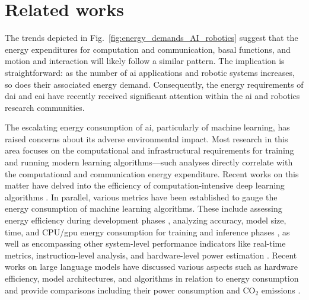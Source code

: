 \documentclass[12pt]{article}
\begin{document}
\section*{Related works}
The trends depicted in Fig.~\ref{fig:energy_demands_AI_robotics} suggest that the energy expenditures for computation and communication, basal functions, and motion and interaction will likely follow a similar pattern. The implication is straightforward: as the number of \acl{ai} applications and robotic systems increases, so does their associated energy demand. Consequently, the energy requirements of \acl{dai} and \acl{eai} have recently received significant attention within the \acl{ai} and robotics research communities.

The escalating energy consumption of \acl{ai}, particularly of machine learning, has raised concerns about its adverse environmental impact. Most research in this area focuses on the computational and infrastructural requirements for training and running modern learning algorithms---such analyses directly correlate with the computational and communication energy expenditure. Recent works on this matter have delved into the efficiency of computation-intensive deep learning algorithms \cite{Schwartz2019GreenAI,Vinuesa2020roleartificialintelligence,Strubell2019EnergyPolicyConsiderations,Luccioni2023EstimatingCarbonFootprint}. In parallel, various metrics have been established to gauge the energy consumption of machine learning algorithms. These include assessing energy efficiency during development phases \cite{Zhou2020HULKEnergyEfficiency}, analyzing accuracy, model size, time, and CPU/\ac{gpu} energy consumption for training and inference phases \cite{Dalgren2019GreenMLmethodology}, as well as encompassing other system-level performance indicators like real-time metrics, instruction-level analysis, and hardware-level power estimation \cite{GarciaMartin2019Estimationenergyconsumption}. Recent works on large language models have discussed various aspects such as hardware efficiency, model architectures, and algorithms in relation to energy consumption \cite{Vries2023growingenergyfootprint} and provide comparisons including their power consumption and CO$_2$ emissions \cite{SIHCAI2023ArtificialIntelligenceIndex}.
\end{document}
